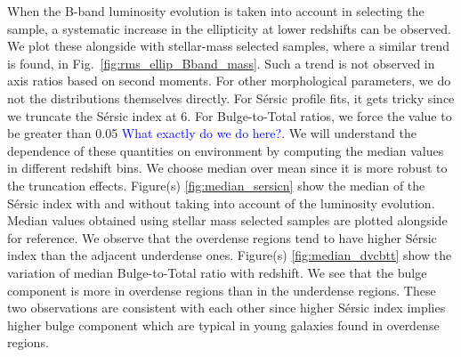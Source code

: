 \documentclass[twocolumn,useAMS,usenatbib]{mn2e}
\newcommand{\arun}[1]{{\textcolor{blue}{#1}}}
\newcommand{\sersic}{S\'{e}rsic }
\newcommand{\btt}{Bulge-to-Total }
\begin{document}
When the B-band luminosity evolution is taken into account in selecting the sample, a systematic increase in the ellipticity at lower redshifts can be observed. We plot these alongside with stellar-mass selected samples, where a similar trend is found, in Fig.~\ref{fig:rms_ellip_Bband_mass}. 
Such a trend is not observed in axis ratios based on second moments. 
For other morphological parameters, we do not the distributions themselves directly. For \sersic profile fits, it gets tricky since we truncate the \sersic index at 6. 
For \btt ratios, we force the value to be greater than 0.05 \arun{What exactly do we do here?}. We will understand the dependence of these quantities on environment by computing the median values in different redshift bins.
We choose median over mean since it is more robust to the truncation effects.
Figure(s) \ref{fig:median_sersicn} show the median of the \sersic index with and without taking into account of the luminosity evolution. Median values obtained using stellar mass selected samples are plotted alongside for reference.
We observe that the overdense regions tend to have higher \sersic index than the adjacent underdense ones.
Figure(s) \ref{fig:median_dvcbtt} show the variation of median \btt ratio with redshift. We see that the bulge component is more in overdense regions than in the underdense regions.
These two observations are consistent with each other since higher \sersic index implies higher bulge component which are typical in young galaxies found in overdense regions.
\end{document}

